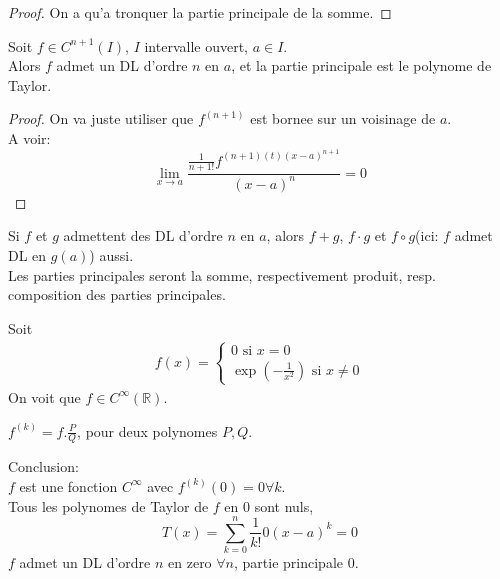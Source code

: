 \documentclass[../main.tex]{subfiles}
\begin{document}
\begin{proof}
On a qu'a tronquer la partie principale de la somme.
\end{proof}
\begin{thm}
	Soit $f\in C^{n+1}( I) $, $I$ intervalle ouvert, $a\in I$.\\
	Alors $f$ admet un DL d'ordre $n$ en $a$, et la partie principale est le polynome de Taylor.
\end{thm}
\begin{proof}
	On va juste utiliser que $f^{( n+1) }$ est bornee sur un voisinage de $a$.\\
	A voir:\\
	\[ 
		\lim_{x \to a} \frac{\frac{1}{n+1!}f^{( n+1) ( t)( x-a)^{n+1} }}{( x-a) ^{n}} = 0
	\]
	
\end{proof}
\begin{exo}
	Si $f$ et $g$ admettent des DL d'ordre $n$ en $a$, alors $f+g$, $f\cdot g$ et $f\circ g$(ici: $f$ admet DL en $g( a) $)  aussi.\\
	Les parties principales seront la somme, respectivement produit, resp. composition des parties principales.
\end{exo}
\begin{exemple}
	Soit
	\begin{align*}
		f( x) =
		\begin{cases}
		0 \text{ si  } x=0\\
		\exp( - \frac{1}{x^{2}}) \text{ si } x\neq 0
		\end{cases}
	\end{align*}
	On voit que $f \in C^{ \infty } ( \mathbb{R}) $.\\
	\begin{lemma}
		$f^{( k) }= f . \frac{P}{Q}$, pour deux polynomes $P, Q$.
	\end{lemma}
	Conclusion:\\
	$f$ est une fonction $C^{ \infty }$ avec $f^{( k) }( 0) =0 \forall k$.\\
	Tous les polynomes de Taylor de $f$ en $0$ sont nuls,
	\[ 
		T( x) = \sum_{k=0}^{ n} \frac{1}{k!}0 ( x-a) ^{k}= 0	
	\]
	$f$ admet un DL d'ordre $n$ en zero $\forall n$, partie principale 0.
	
	

\end{exemple}
\end{document}
